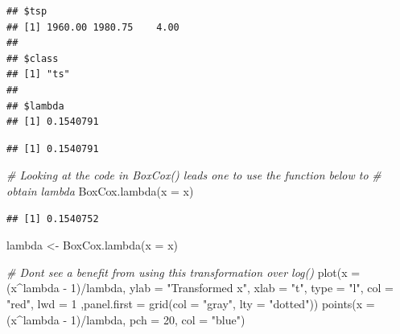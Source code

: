 \documentclass[
]{book}
\newenvironment{Shaded}{\begin{snugshade}}{\end{snugshade}}
\newcommand{\AttributeTok}[1]{\textcolor[rgb]{0.77,0.63,0.00}{#1}}
\newcommand{\CommentTok}[1]{\textcolor[rgb]{0.56,0.35,0.01}{\textit{#1}}}
\newcommand{\DecValTok}[1]{\textcolor[rgb]{0.00,0.00,0.81}{#1}}
\newcommand{\FunctionTok}[1]{\textcolor[rgb]{0.00,0.00,0.00}{#1}}
\newcommand{\NormalTok}[1]{#1}
\newcommand{\OtherTok}[1]{\textcolor[rgb]{0.56,0.35,0.01}{#1}}
\newcommand{\SpecialCharTok}[1]{\textcolor[rgb]{0.00,0.00,0.00}{#1}}
\newcommand{\StringTok}[1]{\textcolor[rgb]{0.31,0.60,0.02}{#1}}
\theoremstyle{definition}
\theoremstyle{definition}
\theoremstyle{definition}
\theoremstyle{definition}
\theoremstyle{remark}
\begin{document}
\begin{verbatim}
## $tsp
## [1] 1960.00 1980.75    4.00
## 
## $class
## [1] "ts"
## 
## $lambda
## [1] 0.1540791
\end{verbatim}

\begin{Shaded}
\end{Shaded}

\begin{verbatim}
## [1] 0.1540791
\end{verbatim}

\begin{Shaded}
\begin{Highlighting}[]
\CommentTok{\# Looking at the code in BoxCox() leads one to use the function below to}
\CommentTok{\#   obtain lambda}
\FunctionTok{BoxCox.lambda}\NormalTok{(}\AttributeTok{x =}\NormalTok{ x)}
\end{Highlighting}
\end{Shaded}

\begin{verbatim}
## [1] 0.1540752
\end{verbatim}

\begin{Shaded}
\begin{Highlighting}[]
\NormalTok{lambda }\OtherTok{\textless{}{-}} \FunctionTok{BoxCox.lambda}\NormalTok{(}\AttributeTok{x =}\NormalTok{ x)}

\CommentTok{\# Don\textquotesingle{}t see a benefit from using this transformation over log()}
\FunctionTok{plot}\NormalTok{(}\AttributeTok{x =}\NormalTok{ (x}\SpecialCharTok{\^{}}\NormalTok{lambda }\SpecialCharTok{{-}} \DecValTok{1}\NormalTok{)}\SpecialCharTok{/}\NormalTok{lambda, }\AttributeTok{ylab =} \StringTok{"Transformed x"}\NormalTok{, }\AttributeTok{xlab =} \StringTok{"t"}\NormalTok{, }\AttributeTok{type =} \StringTok{"l"}\NormalTok{, }\AttributeTok{col =} \StringTok{"red"}\NormalTok{, }\AttributeTok{lwd =} \DecValTok{1}\NormalTok{ ,}\AttributeTok{panel.first =} \FunctionTok{grid}\NormalTok{(}\AttributeTok{col =} \StringTok{"gray"}\NormalTok{, }\AttributeTok{lty =} \StringTok{"dotted"}\NormalTok{))}
\FunctionTok{points}\NormalTok{(}\AttributeTok{x =}\NormalTok{ (x}\SpecialCharTok{\^{}}\NormalTok{lambda }\SpecialCharTok{{-}} \DecValTok{1}\NormalTok{)}\SpecialCharTok{/}\NormalTok{lambda, }\AttributeTok{pch =} \DecValTok{20}\NormalTok{, }\AttributeTok{col =} \StringTok{"blue"}\NormalTok{)}
\end{Highlighting}
\end{Shaded}
\end{document}
